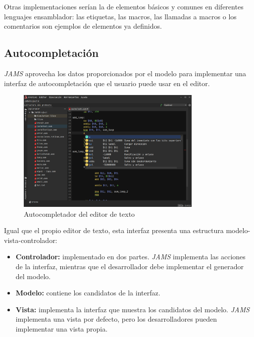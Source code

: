 \noindent Otras implementaciones serían la de elementos
básicos y comunes en diferentes lenguajes ensamblador:
las etiquetas, las macros, las llamadas a macros o
los comentarios son ejemplos de elementos ya definidos.

\subsection{Autocompletación}\label{subsec:autocompletacion}

\textit{JAMS} aprovecha los datos proporcionados por
el modelo para implementar una interfaz de autocompletación
que el usuario puede usar en el editor.

\begin{figure}[H]
    \centering
    \includegraphics[width=0.8\textwidth]{images/base/jams-autocompletion}
    \caption{Autocompletador del editor de texto}
    \label{fig:jams-autocompletador}
\end{figure}

\noindent Igual que el propio editor de texto, esta interfaz
presenta una estructura modelo-vista-controlador:

\begin{itemize}
    \item \textbf{Controlador:} implementado en dos partes.
    \textit{JAMS} implementa las acciones de la interfaz,
    mientras que el desarrollador debe implementar el
    generador del modelo.
    \item \textbf{Modelo:} contiene los candidatos de
    la interfaz.
    \item \textbf{Vista:} implementa la interfaz que
    muestra los candidatos del modelo.
    \textit{JAMS} implementa una vista por defecto,
    pero los desarrolladores pueden implementar una
    vista propia.
\end{itemize}

